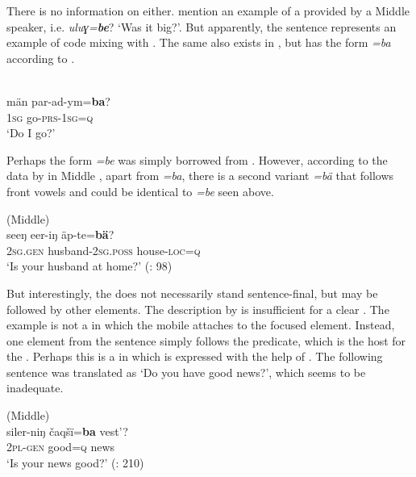 There is no information on  either. \citet[184]{AndersonHarrison2004} mention an example of a  provided by a Middle  speaker, i.e. \textit{uluɣ=}\textbf{\textit{be}}? ‘Was it big?’. But apparently, the sentence represents an example of code mixing with . The same  also exists in , but has the form \textit{=ba} according to \citet{Birjukovich1997}.

\ea%
    \label{ex:turk:59}
    \\
    \gll män  par-ad-ym=\textbf{{ba}}?\\
    1\textsc{sg}  go-\textsc{prs}-1\textsc{sg=q}\\
    \glt ‘Do I go?’ \citep[496]{Birjukovich1997}
    \z

\noindent Perhaps the form \textit{=be} was simply borrowed from . However, according to the data by \cite[97]{LiYong-Sŏng2008} in Middle , apart from \textit{=ba}, there is a second variant \textit{=bä} that follows front vowels and could be identical to \textit{=be} seen above.

\ea%
    \label{ex:turk:60}
     (Middle)\\
    \gll seeŋ    eer-iŋ      äp-te=\textbf{bä}?\\
    2\textsc{sg}.\textsc{gen}  husband-2\textsc{sg}.\textsc{poss}  house-\textsc{loc}=\textsc{q}\\
    \glt ‘Is your husband at home?’ (\citealt{LiYong-Sŏng2008}: 98)
    \z

But interestingly, the  does not necessarily stand sentence-final, but may be followed by other elements. The description by \cite{LiYong-Sŏng2008} is insufficient for a clear . The example is not a  in which the mobile  attaches to the focused element. Instead, one element from the sentence simply follows the predicate, which is the host for the . Perhaps this is a  in which  is expressed with the help of . The following sentence was translated as ‘Do you have good news?’, which seems to be inadequate.

\ea%
    \label{ex:turk:61}
     (Middle)\\
    \gll siler-niŋ  čaqšï=\textbf{ba} vest’?\\
    2\textsc{pl}-\textsc{gen} good=\textsc{q}  news\\
    \glt ‘Is your news good?’ (\citealt{LiYong-Sŏng2008}: 210)
    \z

